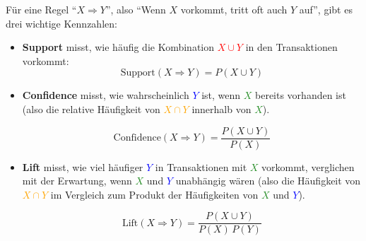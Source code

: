 \begin{mydefinition}
    Für eine Regel \enquote{$X \Rightarrow Y$}, also \enquote{Wenn $X$ vorkommt, tritt oft auch $Y$ auf}, gibt es drei wichtige Kennzahlen:

    \begin{itemize}
        \item \textbf{Support} misst, wie häufig die Kombination \textcolor{red}{$X \cup Y$} in den Transaktionen vorkommt:
              \[
                  \text{Support}(X \Rightarrow Y) = P(X \cup Y)
              \]
        \item \textbf{Confidence} misst, wie wahrscheinlich \textcolor{blue}{$Y$} ist, wenn \textcolor{ForestGreen}{$X$} bereits vorhanden ist (also die relative Häufigkeit von \textcolor{orange}{$X \cap Y$} innerhalb von \textcolor{ForestGreen}{$X$}).

              \[
                  \text{Confidence}(X \Rightarrow Y) = \frac{P(X \cup Y)}{P(X)}
              \]
        \item \textbf{Lift} misst, wie viel häufiger \textcolor{blue}{$Y$} in Transaktionen mit \textcolor{ForestGreen}{$X$} vorkommt, verglichen mit der Erwartung, wenn \textcolor{ForestGreen}{$X$} und \textcolor{blue}{$Y$} unabhängig wären (also die Häufigkeit von \textcolor{orange}{$X \cap Y$} im Vergleich zum Produkt der Häufigkeiten von \textcolor{ForestGreen}{$X$} und \textcolor{blue}{$Y$}).

              \[
                  \text{Lift}(X \Rightarrow Y) = \frac{P(X \cup Y)}{P(X)\,P(Y)}
              \]
    \end{itemize}
\end{mydefinition}

